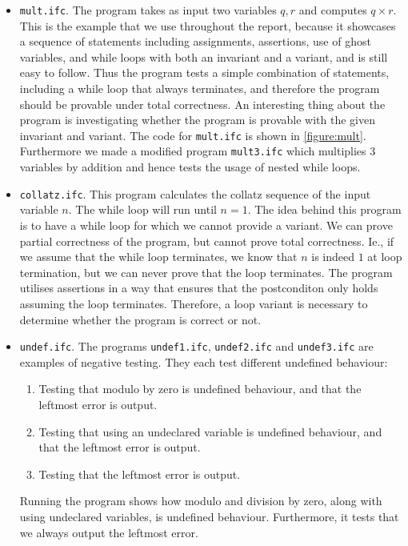 \begin{itemize}
  \item {\texttt{mult.ifc}.} 
	The program takes as input two variables $q,r$ and computes $q \times r$.
  This is the example that we use throughout the report, because it showcases a sequence of statements including assignments, assertions, use of ghost variables, and while loops with both an invariant and a variant, and is still easy to follow.
  Thus the program tests a simple combination of statements, including a while loop that always terminates, and therefore the program should be provable under total correctness.
  An interesting thing about the program is investigating whether the program is provable with the given invariant and variant.
  The code for \texttt{mult.ifc} is shown in \cref{figure:mult}. Furthermore we made a modified program \texttt{mult3.ifc} which multiplies 3 variables by addition and hence tests the usage of nested while loops.

  \item{\texttt{collatz.ifc}.}
  This program calculates the collatz sequence of the input variable $n$. The while loop will run until $n = 1$.
  The idea behind this program is to have a while loop for which we cannot provide a variant. 
	We can prove partial correctness of the program, but cannot prove total correctness.
	Ie., if we assume that the while loop terminates, we know that $n$ is indeed $1$ at loop termination, but we can never prove that the loop terminates.
  The program utilises assertions in a way that ensures that the postconditon only holds assuming the loop terminates.
  Therefore, a loop variant is necessary to determine whether the program is correct or not.

  \item{\texttt{undef.ifc}.}
	The programs \texttt{undef1.ifc}, \texttt{undef2.ifc} and \texttt{undef3.ifc} are examples of negative testing.
  They each test different undefined behaviour:
	\begin{enumerate}
		\item Testing that modulo by zero is undefined behaviour, and that the leftmost error is output.
		\item Testing that using an undeclared variable is undefined behaviour, and that the leftmost error is output.
		\item Testing that the leftmost error is output.
	\end{enumerate}
  Running the program shows how modulo and division by zero, along with using undeclared variables, is undefined behaviour.
	Furthermore, it tests that we always output the leftmost error.


\end{itemize}
